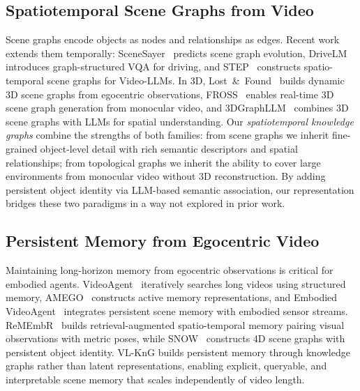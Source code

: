 \subsection{Spatiotemporal Scene Graphs from Video}
Scene graphs encode objects as nodes and relationships as edges.
Recent work extends them temporally: SceneSayer~\cite{scenesayer2024eccv} predicts scene graph evolution, DriveLM~\cite{drivelm2024eccv} introduces graph-structured VQA for driving, and STEP~\cite{step2025cvpr} constructs spatio-temporal scene graphs for Video-LLMs.
In 3D, Lost~\&~Found~\cite{lostfound2025cvpr} builds dynamic 3D scene graphs from egocentric observations, FROSS~\cite{fross2025iccv} enables real-time 3D scene graph generation from monocular video, and 3DGraphLLM~\cite{3dgraphllm2025iccv} combines 3D scene graphs with LLMs for spatial understanding.
Our \textit{spatiotemporal knowledge graphs} combine the strengths of both families: from scene graphs we inherit fine-grained object-level detail with rich semantic descriptors and spatial relationships; from topological graphs we inherit the ability to cover large environments from monocular video without 3D reconstruction. By adding persistent object identity via LLM-based semantic association, our representation bridges these two paradigms in a way not explored in prior work.

\subsection{Persistent Memory from Egocentric Video}
Maintaining long-horizon memory from egocentric observations is critical for embodied agents.
VideoAgent~\cite{videoagent2024eccv} iteratively searches long videos using structured memory, AMEGO~\cite{amego2024eccv} constructs active memory representations, and Embodied VideoAgent~\cite{embodiedvideoagent2025iccv} integrates persistent scene memory with embodied sensor streams.
ReMEmbR~\cite{anwar2024remembr} builds retrieval-augmented spatio-temporal memory pairing visual observations with metric poses, while SNOW~\cite{snow2025arxiv} constructs 4D scene graphs with persistent object identity.
VL-KnG builds persistent memory through knowledge graphs rather than latent representations, enabling explicit, queryable, and interpretable scene memory that scales independently of video length.

